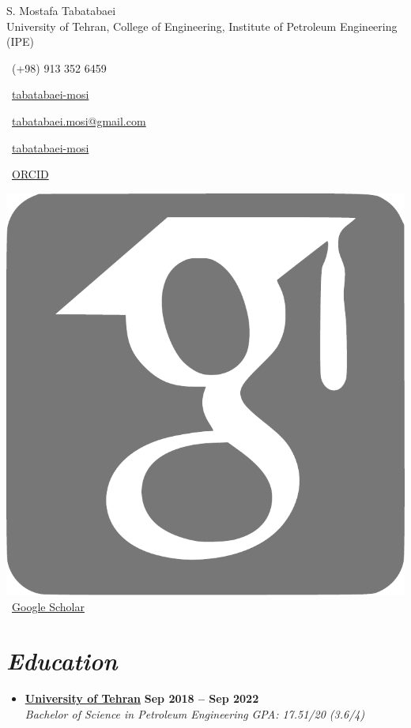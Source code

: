 \documentclass[a4paper, 11pt, sans]{article}
\newcommand{\resumeSubheadingmosi}[4]{
	\vspace{-1pt}\item
	\textbf{#1} \hfill \textbf{\small #2} \\
	\textit{\small#3} \hfill \textit{\small #4} \\
	\vspace{2pt}
}
\newcommand{\resumeSubHeadingListStart}{\begin{itemize}[leftmargin=0.0in, label={}]}
\newcommand{\resumeSubHeadingListEnd}{\end{itemize}}
\newcommand*{\authorimg}[1]{%
	\raisebox{-.3\baselineskip}{%
		\texttt{[image: \#1]}%
	}%
}
\newcommand{\bluesection}[1]{
	\textcolor{navyblue}{\textit{#1}}
}
\newcommand*{\scholarsocialsymbol}{\includegraphics[height=.7\baselineskip]{google-scholar}}
\begin{document}
	
	\begin{center}
		
		{\Huge S. Mostafa Tabatabaei} \\ \vspace{2pt} 
		University of Tehran, College of Engineering, Institute of Petroleum Engineering (IPE)
		\vspace{5pt}
		
	\end{center}
			\begin{multicols}{3}
				\hspace*{2.5cm} \small\faPhone\ (+98) 913 352 6459
				
				\hspace*{2.5cm} \faGithub\ \href{https://github.com/tabatabaei-mosi}{tabatabaei-mosi}
				
				\hspace*{1cm} \faEnvelope\ \href{mailto:tabatabaei.mosi@gmail.com}{tabatabaei.mosi@gmail.com}
				
				\hspace*{1cm} \faLinkedin\ \href{https://www.linkedin.com/in/tabatabaei-mosi}{tabatabaei-mosi}
				
				
				\hspace*{1cm} \faOrcid\ \href{https://orcid.org/0000-0003-4126-9260}{ORCID}
				
				\hspace*{1cm} \scholarsocialsymbol\ \href{https://scholar.google.com/citations?user=_4SuHMEAAAAJ&hl=en}{Google Scholar}
				
				\vspace{8pt}
			\end{multicols}





	
\vspace{2pt}	
\section{\bluesection{Education}}
	\resumeSubHeadingListStart
	\resumeSubheadingmosi
	{\authorimg{images/UT.png} \href{https://www.ut.ac.ir/en}{University of Tehran}}{Sep 2018 -- Sep 2022}
	{\hspace{0.65cm}Bachelor of Science in Petroleum Engineering}{GPA: 17.51/20 (3.6/4)}
	\resumeSubHeadingListEnd
	
	
\end{document}
